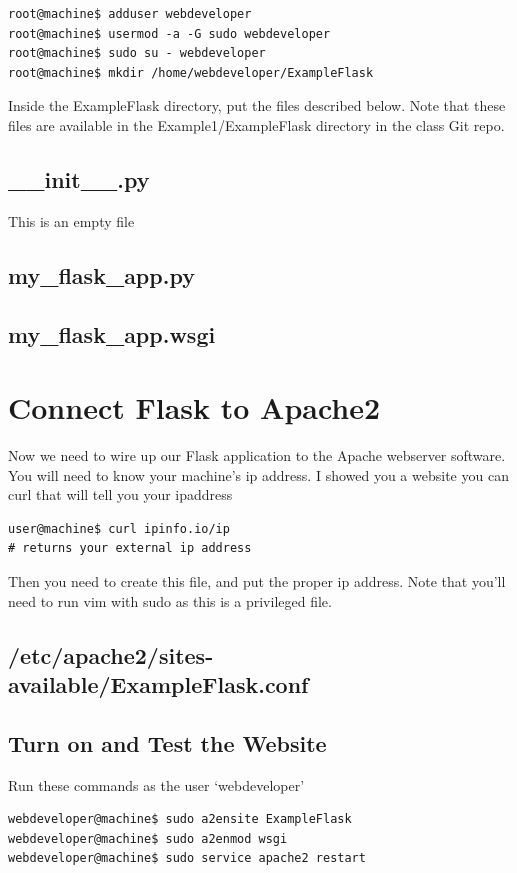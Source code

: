 \documentclass[10pt]{article}
\begin{document}
\begin{lstlisting}
root@machine$ adduser webdeveloper
root@machine$ usermod -a -G sudo webdeveloper
root@machine$ sudo su - webdeveloper
root@machine$ mkdir /home/webdeveloper/ExampleFlask
\end{lstlisting}

Inside the ExampleFlask directory, put the files described below. Note that these files are available in the Example1/ExampleFlask directory in the class Git repo.

\subsection{\_\_init\_\_.py}
This is an empty file

\subsection{my\_flask\_app.py}


\subsection{my\_flask\_app.wsgi}



\section{Connect Flask to Apache2}
Now we need to wire up our Flask application to the Apache webserver software. You will need to know your machine's ip address. I showed you a website you can curl that will tell you your ipaddress

\begin{lstlisting}
user@machine$ curl ipinfo.io/ip
# returns your external ip address
\end{lstlisting}

Then you need to create this file, and put the proper ip address. Note that you'll need to run vim with sudo as this is a privileged file.

\subsection{/etc/apache2/sites-available/ExampleFlask.conf}



\subsection{Turn on and Test the Website}
Run these commands as the user `webdeveloper'
\begin{lstlisting}
webdeveloper@machine$ sudo a2ensite ExampleFlask
webdeveloper@machine$ sudo a2enmod wsgi
webdeveloper@machine$ sudo service apache2 restart
\end{lstlisting}
\end{document}
